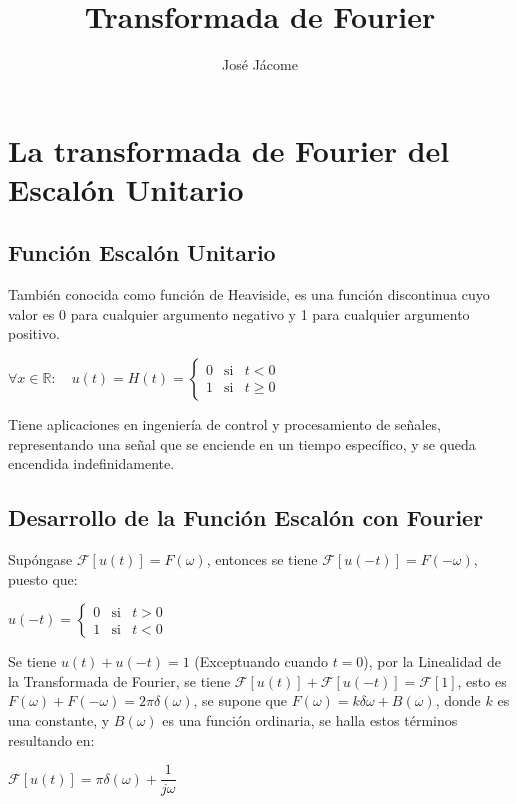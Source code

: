 \documentclass[10pt,a4paper]{article}
\author{José Jácome}
\title{Transformada de Fourier}
\begin{document}
\section{La transformada de Fourier del Escalón Unitario}
\subsection{Función Escalón Unitario}
También conocida como función de Heaviside, es una función discontinua cuyo valor es 0 para cualquier argumento negativo y 1 para cualquier argumento positivo.\\

\begin{center}
$\displaystyle {\forall x \in \mathbb{R} : \quad u(t)=H(t)=\left \{\begin{matrix}0 & \mathrm{si} & t < 0 \\ 1 & \mathrm{si} & t \ge 0 \end{matrix} \right . } $ 
\end{center}

Tiene aplicaciones en ingeniería de control y procesamiento de señales, representando una señal que se enciende en un tiempo específico, y se queda encendida indefinidamente. 

\subsection{Desarrollo de la Función Escalón con Fourier} 
Supóngase $\mathcal{F}[u(t)] = F(\omega)$, entonces se tiene $\mathcal{F}[u(-t)] = F(- \omega)$, puesto que: 
\begin{center}
$\displaystyle { u(-t)=\left \{\begin{matrix}0 & \mathrm{si} & t > 0 \\ 1 & \mathrm{si} & t < 0 \end{matrix} \right . } $ 
\end{center}
Se tiene $u(t) + u(-t) = 1$ (Exceptuando cuando $t=0$), por la Linealidad de la Transformada de Fourier, se tiene $\mathcal{F} [u(t)] + \mathcal{F} [u(-t)] = \mathcal{F} [1]$, esto es $F(\omega) + F(-\omega) = 2 \pi \delta (\omega)$, se supone que $F(\omega)=k \delta{\omega} + B (\omega)$, donde $k$ es una constante, y $B(\omega)$ es una función ordinaria, se halla estos términos resultando en:\\
\begin{center}
$\mathcal{F}[u(t)] = \pi \delta (\omega) + \dfrac{1}{j \omega}$
\end{center}
\end{document}
